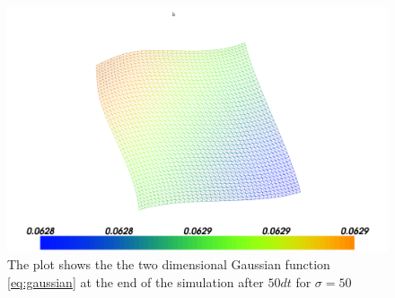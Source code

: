 \begin{figure}[h]
\begin{center}
\includegraphics[scale=0.2]{images/ex_h_50_end.png}
\end{center}
\caption{The plot shows the the two dimensional Gaussian function \eqref{eq:gaussian} at the end of the simulation after $50 dt$ for $\sigma = 50$}
\label{fig:ex_h_50_end}
\end{figure}
